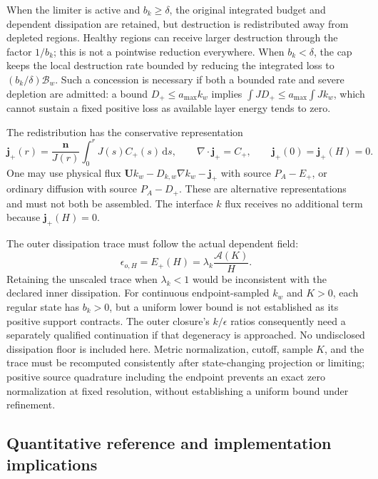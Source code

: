 \documentclass[11pt,a4paper]{article}
\numberwithin{equation}{section}
\begin{document}
When the limiter is active and $b_k\geq\delta$, the original integrated
budget and dependent dissipation are retained, but destruction is
redistributed away from depleted regions. Healthy regions can receive
larger destruction through the factor $1/b_k$; this is not a pointwise
reduction everywhere. When $b_k<\delta$, the cap keeps the local
destruction rate bounded by reducing the integrated loss to
$(b_k/\delta)\mathcal B_w$. Such a concession is necessary if both
a bounded rate and severe depletion are admitted: a bound
$D_+\leq a_{\max}k_w$ implies
$\int JD_+\leq a_{\max}\int Jk_w$, which cannot sustain a fixed
positive loss as available layer energy tends to zero.

The redistribution has the conservative representation
\begin{equation}
 \boldsymbol j_+(r)=\frac{\boldsymbol n}{J(r)}
       \int_0^rJ(s)C_+(s)\,\mathrm ds,\qquad
 \nabla\cdot\boldsymbol j_+=C_+,\qquad
 \boldsymbol j_+(0)=\boldsymbol j_+(H)=0.
 \label{ba:positive-flux}
\end{equation}
One may use physical flux
$\boldsymbol U k_w-D_{k,w}\nabla k_w-\boldsymbol j_+$
with source $P_A-E_+$, or ordinary diffusion with source $P_A-D_+$.
These are alternative representations and must not both be assembled.
The interface $k$ flux receives no additional term because
$\boldsymbol j_+(H)=0$.

The outer dissipation trace must follow the actual dependent field:
\begin{equation}
 \boxed{\epsilon_{o,H}=E_+(H)
 =\lambda_k\frac{\mathcal A(K)}H.}
 \label{ba:positive-trace}
\end{equation}
Retaining the unscaled trace when $\lambda_k<1$ would be inconsistent
with the declared inner dissipation. For continuous endpoint-sampled
$k_w$ and $K>0$, each regular state has $b_k>0$, but a uniform lower
bound is not established as its positive support contracts. The outer
closure's $k/\epsilon$ ratios consequently need a separately qualified
continuation if that degeneracy is approached. No undisclosed
dissipation floor is included here. Metric normalization, cutoff,
sample $K$, and the trace must be recomputed consistently after
state-changing projection or limiting; positive source quadrature
including the endpoint prevents an exact zero normalization at fixed
resolution, without establishing a uniform bound under refinement.

\subsection{Quantitative reference and implementation implications}
\label{ba:example}
\end{document}
